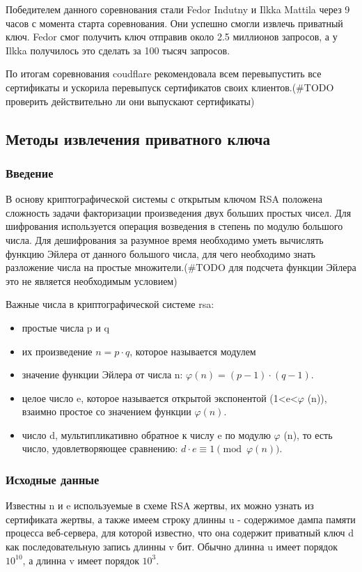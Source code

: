 \documentclass[20pt]{article}
\begin{document}
Победителем данного соревнования стали Fedor Indutny\cite{heartbleed/Indutny} и
Ilkka Mattila через 9 часов с момента старта соревнования. Они успешно смогли
извлечь приватный ключ. Fedor смог получить ключ отправив около 2.5 миллионов
запросов, а у Ilkka получилось это сделать за 100 тысяч запросов.

По итогам соревнования coudflare рекомендовала всем перевыпустить все сертификаты
и ускорила перевыпуск сертификатов своих клиентов.(\#TODO проверить действительно
ли они выпускают сертификаты)

\subsection{Методы извлечения приватного ключа \cite{playing-hide-and-seek-with-stored-keys} }

\subsubsection{Введение}
В основу криптографической системы с открытым ключом RSA положена сложность задачи
факторизации произведения двух больших простых чисел. Для шифрования используется
операция возведения в степень по модулю большого числа. Для дешифрования за
разумное время необходимо уметь вычислять функцию Эйлера от данного большого
числа, для чего необходимо знать разложение числа на простые множители.(\#TODO
для подсчета функции Эйлера это не является необходимым условием)

Важные числа в криптографической системе rsa:
\begin{itemize}
  \item простые числа p и q
  \item их произведение $n=p \cdot q$, которое называется модулем
  \item значение функции Эйлера от числа n: $\varphi (n)=(p-1)\cdot (q-1)$.
  \item целое число e, которое называется открытой экспонентой
    (1<e<$\varphi$ (n)), взаимно простое со значением функции $\varphi(n)$.
  \item число d, мультипликативно обратное к числу e по модулю
    $\varphi$ (n), то есть число, удовлетворяющее сравнению: $d\cdot e\equiv 1{\pmod {\varphi (n)}}$.
\end{itemize}

\subsubsection{Исходные данные}
Известны n и e используемые в схеме RSA жертвы, их можно узнать из сертификата
жертвы, а также имеем строку длинны u - содержимое дампа памяти процесса
веб-сервера, для которой известно, что она содержит приватный ключ d как
последовательную запись длинны v бит. Обычно длинна u имеет порядок $10^10$,
а длинна v имеет порядок $10^3$.
\end{document}
